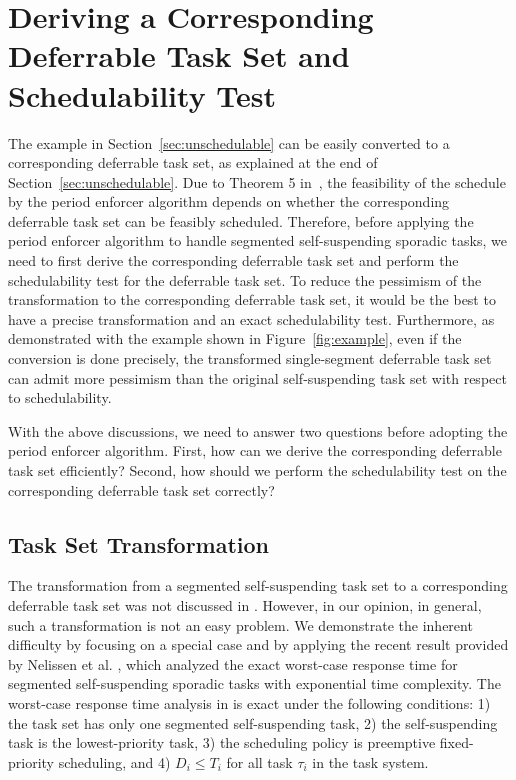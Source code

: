 
\section{Deriving a Corresponding Deferrable Task Set and Schedulability Test}
\label{sec:convert}

The example in Section~\ref{sec:unschedulable} can be easily converted to a corresponding deferrable task set, as explained at the end of Section~\ref{sec:unschedulable}.  Due to Theorem 5 in~\cite{Raj:suspension1991}, the feasibility of the schedule by the period enforcer algorithm depends on whether the corresponding deferrable task set can be feasibly scheduled. Therefore, before applying the period enforcer algorithm to handle segmented self-suspending sporadic tasks, we need to first derive the corresponding deferrable task set and perform the schedulability test for the deferrable task set. To reduce the pessimism of the transformation to the corresponding deferrable task set, it would be the best to have a precise transformation and an exact schedulability test. Furthermore, as demonstrated with the example shown in Figure~\ref{fig:example}, even if the conversion is done precisely, the transformed single-segment deferrable task set can admit more pessimism than the original self-suspending task set with respect to schedulability.


With the above discussions, we need to answer two questions before adopting the period enforcer algorithm. First, how can we derive the corresponding deferrable task set efficiently? Second, how should we perform the schedulability test on the corresponding deferrable task set correctly?

\subsection{Task Set Transformation}
\label{sec:transformation-exponential}

The transformation from a segmented self-suspending task set to a corresponding deferrable task set was not discussed in \cite{Raj:suspension1991}. However, in our opinion, in general, such a transformation is not an easy problem. We demonstrate the inherent difficulty by focusing on a special case and by applying the recent result provided by Nelissen et al. \cite{ecrts15nelissen}, which analyzed the exact worst-case response time for segmented self-suspending sporadic tasks with exponential time complexity. The worst-case response time analysis in \cite{ecrts15nelissen} is exact under the following conditions: 1) the task set has only one segmented self-suspending task, 2) the self-suspending task is the lowest-priority task, 3) the scheduling policy is preemptive fixed-priority scheduling, and 4) $D_i \leq T_i$ for all task $\tau_i$ in the task system.

